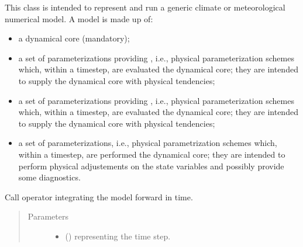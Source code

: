 \documentclass[letterpaper,10pt,english]{sphinxmanual}
\begin{document}
\begin{fulllineitems}
\label{\detokenize{api:model.Model}}
This class is intended to represent and run a generic climate or meteorological numerical model.
A model is made up of:
\begin{itemize}
\item {} 
a dynamical core (mandatory);

\item {} 
a set of parameterizations providing , i.e., physical parameterization                       schemes which, within a timestep, are evaluated  the dynamical core; they are intended                  to supply the dynamical core with physical tendencies;

\item {} 
a set of parameterizations providing , i.e., physical parameterization                       schemes which, within a timestep, are evaluated  the dynamical core; they are intended                  to supply the dynamical core with physical tendencies;

\item {} 
a set of  parameterizations, i.e., physical parametrization schemes which,                             within a timestep, are performed  the dynamical core; they are intended to perform physical                      adjustements on the state variables and possibly provide some diagnostics.

\end{itemize}

\begin{fulllineitems}
\label{\detokenize{api:model.Model.__call__}}
Call operator integrating the model forward in time.
\begin{quote}\begin{description}
\item[{Parameters}] \leavevmode\begin{itemize}
\item {} 
 () \textendash{}  representing the time step.


\end{itemize}
\end{description}
\end{quote}
\end{fulllineitems}
\end{fulllineitems}
\end{document}
